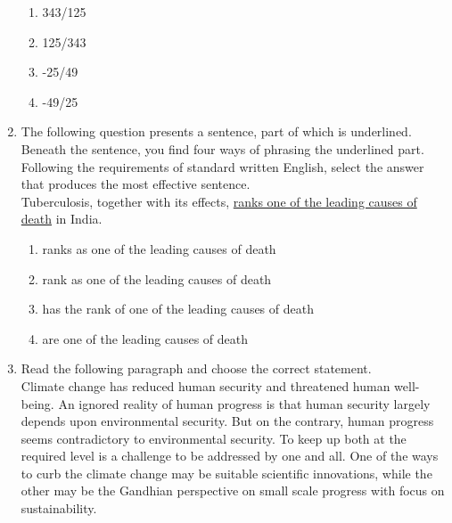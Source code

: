 \documentclass[journal]{IEEEtran}
\numberwithin{equation}{enumi}
\numberwithin{figure}{enumi}
\begin{document}
\begin{enumerate}[start=1]
\begin{enumerate}
    \item 343/125
    \item 125/343
    \item -25/49
    \item -49/25
\end{enumerate}
\item The following question presents a sentence, part of which is underlined. Beneath the sentence, you find four ways of phrasing the underlined part. Following the requirements of standard written English, select the answer that produces the most effective sentence.\\
Tuberculosis, together with its effects, \underline{ranks one of the leading causes of death} in India.
\begin{enumerate}
    \item ranks as one of the leading causes of death
    \item rank as one of the leading causes of death
    \item has the rank of one of the leading causes of death
    \item are one of the leading causes of death
\end{enumerate}
\item Read the following paragraph and choose the correct statement.\\
    
    Climate change has reduced human security and threatened human well-being. An ignored reality of human progress is that human security largely depends upon environmental security. But on the contrary, human progress seems contradictory to environmental security. To keep up both at the required level is a challenge to be addressed by one and all. One of the ways to curb the climate change may be suitable scientific innovations, while the other may be the Gandhian perspective on small scale progress with focus on sustainability.
    

\end{enumerate}
\end{document}
